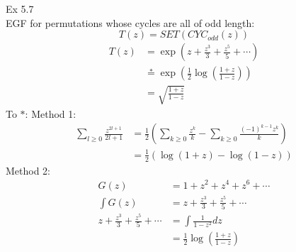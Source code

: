 \documentclass{article}
\begin{document}
Ex 5.7\\
EGF for permutations whose cycles are all of odd length:\\
\[
    T(z) = SET(CYC_{odd}(z))\]
\begin{align*}
    T(z) &= \exp(z + \frac{z^3}{3} + \frac{z^5}{5} + \cdots)\\
    &\stackrel{*}{=} \exp(\frac{1}{2}\log(\frac{1+z}{1-z}))\\
    &= \sqrt{\frac{1+z}{1-z}}
\end{align*}
To $*$:
Method 1:
\begin{align*}
    \sum_{l \geq 0} \frac{z^{2l+1}}{2l+1} &= \frac{1}{2}(\sum_{k\geq 0}\frac{z^k}{k} - \sum_{k\geq0}\frac{(-1)^{k-1}z^k}{k})\\
    &= \frac{1}{2}(\log(1 + z) - \log(1 - z))
\end{align*}
Method 2:
\begin{align*}
    G(z) &= 1 + z^2 + z^4 + z^6 +\cdots \\
    \int G(z) &= z + \frac{z^3}{3} + \frac{z^5}{5} + \cdots \\
    z + \frac{z^3}{3} + \frac{z^5}{5} + \cdots &= \int \frac{1}{1-z^2}dz\\
    &= \frac{1}{2}\log(\frac{1+z}{1-z})
\end{align*}
\end{document}
